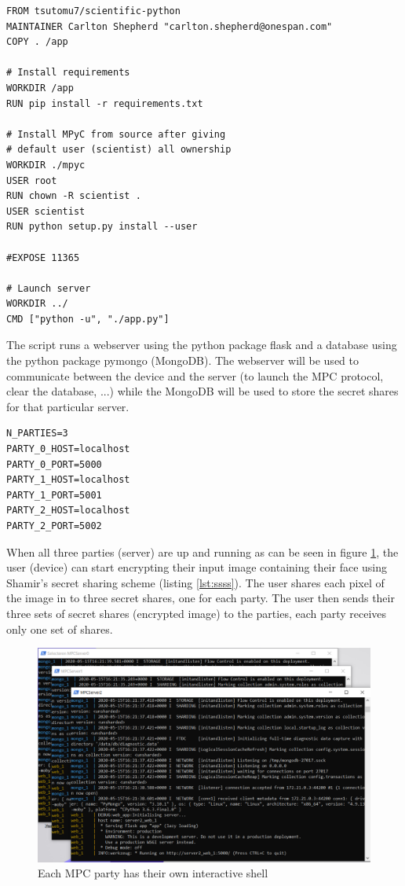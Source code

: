 \begin{lstlisting}[caption={Docker files for servers}, label={lst:docker}, frame=single]
FROM tsutomu7/scientific-python
MAINTAINER Carlton Shepherd "carlton.shepherd@onespan.com"
COPY . /app

# Install requirements
WORKDIR /app
RUN pip install -r requirements.txt

# Install MPyC from source after giving
# default user (scientist) all ownership
WORKDIR ./mpyc
USER root
RUN chown -R scientist .
USER scientist
RUN python setup.py install --user

#EXPOSE 11365

# Launch server
WORKDIR ../
CMD ["python -u", "./app.py"]
\end{lstlisting}

The  script runs a webserver using the python package flask and a database using the python package pymongo (MongoDB). The webserver will be used to communicate between the device and the server (to launch the MPC protocol, clear the database, ...) while the MongoDB will be used to store the secret shares for that particular server.

\begin{lstlisting}[caption={Environment file for servers}, label={lst:env}, frame=single]
N_PARTIES=3
PARTY_0_HOST=localhost
PARTY_0_PORT=5000
PARTY_1_HOST=localhost
PARTY_1_PORT=5001
PARTY_2_HOST=localhost
PARTY_2_PORT=5002
\end{lstlisting}

When all three parties (server) are up and running as can be seen in figure \ref{fig:mpc_shells}, the user (device) can start encrypting their input image containing their face using Shamir's secret sharing scheme (listing \ref{lst:ssss}). The user shares each pixel of the image in to three secret shares, one for each party. The user then sends their three sets of secret shares (encrypted image) to the parties, each party receives only one set of shares.

\begin{figure}[H]
  \includegraphics[scale=0.5]{fig/mpc_shells.png}
  \centering
  \caption{Each MPC party has their own interactive shell}
  \label{fig:mpc_shells}
\end{figure}

